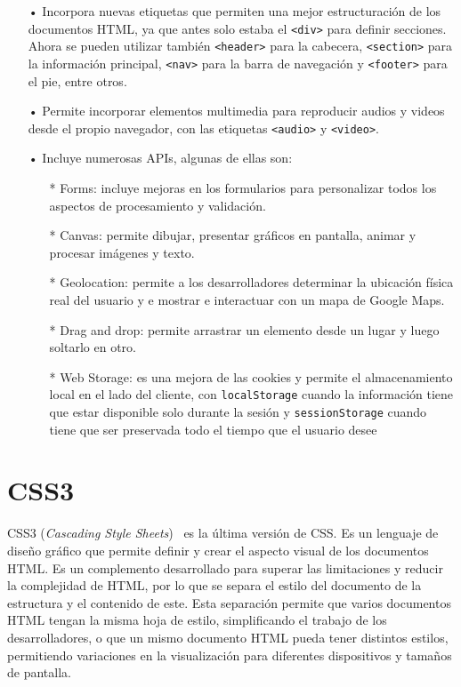 \documentclass[a4paper, 12pt]{book}
\begin{document}
	\begin{itemize}
	\item[•] Incorpora nuevas etiquetas que permiten una mejor estructuración de los documentos HTML, ya que antes solo estaba el \texttt{<div>} para definir secciones. Ahora se pueden utilizar también \texttt{<header>} para la cabecera, \texttt{<section>} para la información principal, \texttt{<nav>} para la barra de navegación y \texttt{<footer>} para el pie, entre otros.
	\item[•] Permite incorporar elementos multimedia para reproducir audios y videos desde el propio navegador, con las etiquetas \texttt{<audio>} y \texttt{<video>}.
	\item[•] Incluye numerosas APIs, algunas de ellas son:
		\begin{itemize}
		\item[*] Forms: incluye mejoras en los formularios para personalizar todos los aspectos de procesamiento y validación.
		\item[*] Canvas: permite dibujar, presentar gráficos en pantalla, animar y procesar imágenes y texto.
		\item[*] Geolocation: permite a los desarrolladores determinar la ubicación física real del usuario y e mostrar e interactuar con un mapa de Google Maps.
		\item[*] Drag and drop: permite arrastrar un elemento desde un lugar y luego soltarlo en otro.
		\item[*] Web Storage: es una mejora de las cookies y permite el almacenamiento local en el lado del cliente, con \texttt{localStorage} cuando la información tiene que estar disponible solo durante la sesión y \texttt{sessionStorage} cuando tiene que ser preservada todo el tiempo que el usuario desee
		\end{itemize}
	\end{itemize}


\section{CSS3} 
\label{sec:CSS3}

CSS3 (\emph{Cascading Style Sheets})~\cite{gauchat2012gran} es la última versión de CSS. Es un lenguaje de diseño gráfico que permite definir y crear el aspecto visual de los documentos HTML. Es un complemento desarrollado para superar las limitaciones y reducir la complejidad de HTML, por lo que se separa el estilo del documento de la estructura y el contenido de este. Esta separación permite que varios documentos HTML tengan la misma hoja de estilo, simplificando el trabajo de los desarrolladores, o que un mismo documento HTML pueda tener distintos estilos, permitiendo variaciones en la visualización para diferentes dispositivos y tamaños de pantalla.
\end{document}
